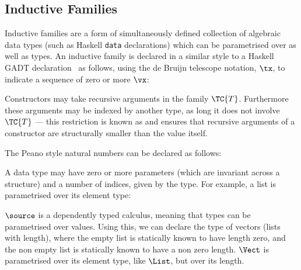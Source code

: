 \subsection{Inductive Families}

\label{indfamilies}

Inductive families \cite{dybjer94} are a form of simultaneously
defined collection of algebraic data types (such as Haskell
\texttt{data} declarations) which can be parametrised over
 as well as types.  An inductive family is declared 
in a similar style to a Haskell GADT declaration~\cite{gadts}
as
follows, using the de Bruijn telescope notation, $\tx$, to indicate a
sequence of zero or more $\vx$:


Constructors may take recursive arguments in the family
$\TC{T}$. Furthermore these arguments may be indexed by another type,
as long it does not involve $\TC{T}$ --- this restriction is known as
 and ensures that recursive arguments of a
constructor are structurally smaller than the value itself.

The Peano style natural numbers can be declared as follows:

\DM{
\Data\:\Nat\Hab\Type\hg\Where\hg\Z\Hab\Nat\:\mid\:\suc\Hab\fbind{\vk}{\Nat}{\Nat}
}

A data type may have zero or more parameters (which are invariant
across a structure) and a number of indices, given by the type. For
example, a list is parametrised over its element type:

\DM{
\AR{
\Data\:\List\:(\vA\Hab\Type)\Hab\Type\hg\Where
\ARd{
& \nil\Hab\List\:\vA\\
\mid & \cons\Hab\fbind{\vx}{\vA}{\fbind{\vxs}{\List\:\vA}{\List\:\vA}}
}
}
}

$\source$ is a dependently typed calculus, meaning that types can be
parametrised over values. Using this, we can declare the type of
vectors (lists with length), where the empty list is statically known
to have length zero, and the non empty list is statically known to
have a non zero length. $\Vect$ is parametrised over its element type,
like $\List$, but  over its length.

\DM{
\AR{
\Data\:\Vect\:(\vA\Hab\Type)\Hab\Nat\to\Type\hg\Where \\
\hg\hg\ARd{
& \Vnil\Hab\Vect\:\vA\:\Z\\
\mid & \Vcons\Hab\fbind{\vk}{\Nat}{
\fbind{\vx}{\vA}{\fbind{\vxs}{\Vect\:\vA\:\vk}{\Vect\:\vA\:(\suc\:\vk)}}
}
}
}
}

